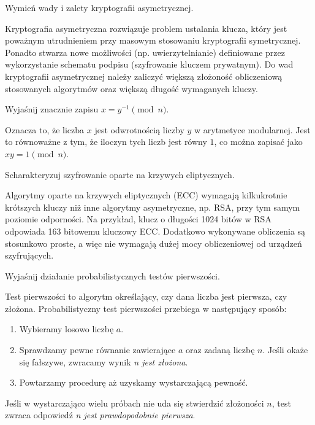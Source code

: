 \documentclass[answers,11pt]{exam}
\begin{document}
\begin{questions}
\question Wymień wady i zalety kryptografii asymetrycznej.
\begin{solution}
Kryptografia asymetryczna rozwiązuje problem ustalania klucza, który jest poważnym utrudnieniem przy masowym stosowaniu kryptografii symetrycznej. Ponadto stwarza nowe możliwości (np. uwierzytelnianie) definiowane przez wykorzystanie schematu podpisu (szyfrowanie kluczem prywatnym). Do wad kryptografii asymetrycznej należy zaliczyć większą złożoność obliczeniową stosowanych algorytmów oraz większą długość wymaganych kluczy.
\end{solution}


\question Wyjaśnij znacznie zapisu $x = y^{-1} \pmod{n}$.
\begin{solution}
Oznacza to, że liczba $x$ jest odwrotnością liczby $y$ w arytmetyce modularnej. Jest to równoważne z tym, że iloczyn tych liczb jest równy $1$, co można zapisać jako $x y = 1 \pmod{n}$.
\end{solution}

\question Scharakteryzuj szyfrowanie oparte na krzywych eliptycznych.
\begin{solution}
Algorytmy oparte na krzywych eliptycznych (ECC) wymagają kilkukrotnie krótszych kluczy niż inne algorytmy asymetryczne, np. RSA, przy tym samym poziomie odporności. Na przykład, klucz o długości 1024 bitów w RSA odpowiada 163 bitowemu kluczowy ECC.
Dodatkowo wykonywane obliczenia są stosunkowo proste, a więc nie wymagają dużej mocy obliczeniowej od urządzeń szyfrujących.
\end{solution}

\question Wyjaśnij działanie probabilistycznych testów pierwszości.
\begin{solution}
Test pierwszości to algorytm określający, czy dana liczba jest pierwsza, czy złożona. Probabilistyczny test pierwszości przebiega w następujący sposób:
\begin{enumerate}
\item Wybieramy losowo liczbę $a$.
\item Sprawdzamy pewne równanie zawierające $a$ oraz zadaną liczbę $n$. Jeśli okaże się fałszywe, zwracamy wynik \textit{n jest złożona}.
\item Powtarzamy procedurę aż uzyskamy wystarczającą pewność.
\end{enumerate}
Jeśli w wystarczająco wielu próbach nie uda się stwierdzić złożoności $n$, test zwraca odpowiedź \textit{n jest prawdopodobnie pierwsza}.
\end{solution}


\end{questions}
\end{document}
